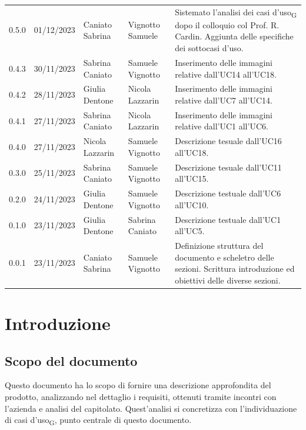 \documentclass{article}
\begin{document}
\begin{center}
\begin{tabular}{P{4em} P{6em} P{7em} P{7em} P{11em}}
    \end{tabular}


\begin{tabular}{P{4em} P{6em} P{7em} P{7em} P{11em}} 
    0.5.0 & 01/12/2023 & Caniato Sabrina & Vignotto Samuele & Sistemato l'analisi dei casi d'uso\textsubscript{G} dopo il colloquio col Prof. R. Cardin. Aggiunta delle specifiche dei sottocasi d'uso.\\
    0.4.3 & 30/11/2023 & Sabrina Caniato & Samuele Vignotto & Inserimento delle immagini relative dall'UC14 all'UC18.\\
    0.4.2 & 28/11/2023 & Giulia Dentone & Nicola Lazzarin & Inserimento delle immagini relative dall'UC7 all'UC14.\\
    0.4.1 & 27/11/2023 & Sabrina Caniato & Nicola Lazzarin & Inserimento delle immagini relative dall'UC1 all'UC6.\\
    0.4.0 & 27/11/2023 & Nicola Lazzarin & Samuele Vignotto & Descrizione tesuale dall'UC16 all'UC18. \\
    0.3.0 & 25/11/2023 & Sabrina Caniato & Samuele Vignotto & Descrizione tesuale dall'UC11 all'UC15. \\
    0.2.0 & 24/11/2023 & Giulia Dentone & Samuele Vignotto & Descrizione testuale dall'UC6 all'UC10.\\ 
    0.1.0 & 23/11/2023 & Giulia Dentone & Sabrina Caniato & Descrizione testuale dall'UC1 all'UC5.\\
    0.0.1 & 23/11/2023 & Caniato Sabrina  & Samuele Vignotto & Definizione struttura del documento e scheletro delle sezioni. Scrittura introduzione ed obiettivi delle diverse sezioni.\\ 
\end{tabular}
\end{center}
\newpage
\tableofcontents
\listoffigures
\listoftables
\newpage
\section*{Introduzione}

\subsection*{Scopo del documento}

Questo documento ha lo scopo di fornire una descrizione approfondita del prodotto, analizzando nel dettaglio i requisiti, ottenuti tramite incontri con l'azienda e analisi del capitolato. Quest'analisi si concretizza con l'individuazione di casi d'uso\textsubscript{G}, punto centrale di questo documento.
\end{document}
